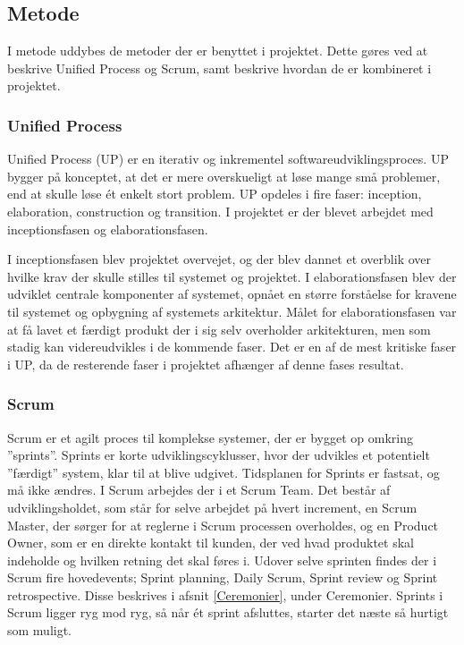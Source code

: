 \documentclass[../../main.tex]{subfiles}
\begin{document}
\subsection{Metode}
I metode uddybes de metoder der er benyttet i projektet. Dette gøres ved at beskrive Unified Process og Scrum, samt beskrive hvordan de er kombineret i projektet.

\subsubsection{Unified Process}
Unified Process (UP) er en iterativ og inkrementel softwareudviklingsproces. UP bygger på konceptet, at det er mere overskueligt at løse mange små problemer, end at skulle løse ét enkelt stort problem. UP opdeles i fire faser: inception, elaboration, construction og transition. I projektet er der blevet arbejdet med inceptionsfasen og elaborationsfasen.  

I inceptionsfasen blev projektet overvejet, og der blev dannet et overblik over hvilke krav der skulle stilles til systemet og projektet.
I elaborationsfasen blev der udviklet centrale komponenter af systemet, opnået en større forståelse for kravene til systemet og opbygning af systemets arkitektur. Målet for elaborationsfasen var at få lavet et færdigt produkt der i sig selv overholder arkitekturen, men som stadig kan videreudvikles i de kommende faser. Det er en af de mest kritiske faser i UP, da de resterende faser i projektet afhænger af denne fases resultat.

\subsubsection{Scrum}
Scrum er et agilt proces til komplekse systemer, der er bygget op omkring ”sprints”. Sprints er korte udviklingscyklusser, hvor der udvikles et potentielt ”færdigt” system, klar til at blive udgivet. Tidsplanen for Sprints er fastsat, og må ikke ændres. I Scrum arbejdes der i et Scrum Team. Det består af udviklingsholdet, som står for selve arbejdet på hvert increment, en Scrum Master, der sørger for at reglerne i Scrum processen overholdes, og en Product Owner, som er en direkte kontakt til kunden, der ved hvad produktet skal indeholde og hvilken retning det skal føres i.
Udover selve sprinten findes der i Scrum fire hovedevents; Sprint planning, Daily Scrum, Sprint review og Sprint retrospective. Disse beskrives i afsnit \ref{Ceremonier}, under Ceremonier.
Sprints i Scrum ligger ryg mod ryg, så når ét sprint afsluttes, starter det næste så hurtigt som muligt.
\end{document}
